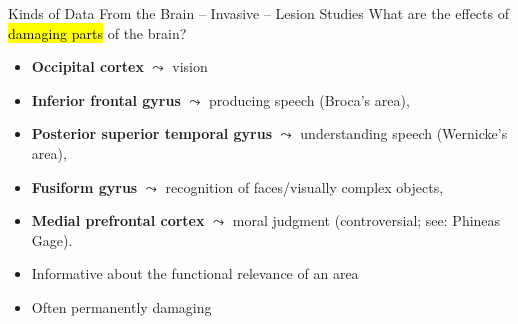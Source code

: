 \documentclass[handout,aspectratio=169]{beamer}
\begin{document}
\begin{frame}{Kinds of Data From the Brain -- Invasive -- Lesion Studies}
	What are the effects of \hl{damaging parts} of the brain?\\[0.25cm]
	\begin{itemize}
		\setlength\itemsep{0.25cm}
		\item \textbf{Occipital cortex} $\leadsto$ vision
		\item \textbf{Inferior frontal gyrus} $\leadsto$ producing speech (Broca's area),
		\item \textbf{Posterior superior temporal gyrus} $\leadsto$ understanding speech (Wernicke's area),
		\item \textbf{Fusiform gyrus} $\leadsto$ recognition of faces/visually complex objects,
		\item \textbf{Medial prefrontal cortex} $\leadsto$ moral judgment (controversial; see: Phineas Gage).
	\end{itemize}
	\vspace{0.25cm}
	\begin{itemize}
		\setlength\itemsep{0.25cm}
		\item[\OPlus] Informative about the functional relevance of an area
		\item[\OMinus] Often permanently damaging
	\end{itemize}
\end{frame}
\end{document}
